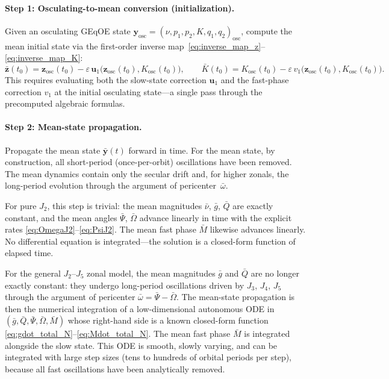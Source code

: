 \documentclass[11pt]{article}
\begin{document}


\paragraph{Step 1: Osculating-to-mean conversion (initialization).}
Given an osculating GEqOE state
$\bm{y}_{\mathrm{osc}} = (\nu, p_1, p_2, K, q_1, q_2)_{\mathrm{osc}}$,
compute the mean initial state via the first-order inverse
map~\eqref{eq:inverse_map_z}--\eqref{eq:inverse_map_K}:
\begin{equation}
\bar{\bm{z}}(t_0)
= \bm{z}_{\mathrm{osc}}(t_0)
- \varepsilon\,\bm{u}_1\!\bigl(\bm{z}_{\mathrm{osc}}(t_0),
  K_{\mathrm{osc}}(t_0)\bigr),
\qquad
\bar K(t_0)
= K_{\mathrm{osc}}(t_0)
- \varepsilon\,v_1\!\bigl(\bm{z}_{\mathrm{osc}}(t_0),
  K_{\mathrm{osc}}(t_0)\bigr).
\end{equation}
This requires evaluating both the slow-state correction $\bm{u}_1$ and the
fast-phase correction $v_1$ at the initial osculating state---a single pass
through the precomputed algebraic formulas.

\paragraph{Step 2: Mean-state propagation.}
Propagate the mean state $\bar{\bm{y}}(t)$ forward in time. For the mean
state, by construction, all short-period (once-per-orbit) oscillations have
been removed. The mean dynamics contain only the secular drift and, for
higher zonals, the long-period evolution through the argument of
pericenter~$\bar\omega$.

For pure $J_2$, this step is trivial: the mean magnitudes $\bar\nu$,
$\bar g$, $\bar Q$ are exactly constant, and the mean angles
$\bar\Psi$, $\bar\Omega$ advance linearly in time with the explicit rates
\eqref{eq:OmegaJ2}--\eqref{eq:PsiJ2}. The mean fast phase
$\bar M$ likewise advances linearly. No differential equation is
integrated---the solution is a closed-form function of elapsed time.

For the general $J_2$--$J_5$ zonal model, the mean magnitudes $\bar g$
and $\bar Q$ are no longer exactly constant: they undergo long-period
oscillations driven by $J_3$, $J_4$, $J_5$ through the argument of
pericenter $\bar\omega = \bar\Psi - \bar\Omega$. The mean-state
propagation is then the numerical integration of a low-dimensional autonomous
ODE in $(\bar g, \bar Q, \bar\Psi, \bar\Omega, \bar M)$ whose right-hand
side is a known closed-form function
\eqref{eq:gdot_total_N}--\eqref{eq:Mdot_total_N}. The mean fast phase
$\bar M$ is integrated alongside the slow state. This ODE is
smooth, slowly varying, and can be integrated with large step sizes
(tens to hundreds of orbital periods per step), because all fast oscillations
have been analytically removed.
\end{document}
